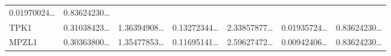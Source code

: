 \documentclass[
]{article}
\begin{document}
\begin{longtable}[]{@{}lllllll@{}}
\begin{minipage}[t]{0.12\columnwidth}
0.01970024\ldots{}\strut
\end{minipage} & \begin{minipage}[t]{0.12\columnwidth}\raggedright
0.83624230\ldots{}\strut
\end{minipage}\tabularnewline
\begin{minipage}[t]{0.08\columnwidth}\raggedright
TPK1\strut
\end{minipage} & \begin{minipage}[t]{0.12\columnwidth}\raggedright
0.31038423\ldots{}\strut
\end{minipage} & \begin{minipage}[t]{0.12\columnwidth}\raggedright
1.36394908\ldots{}\strut
\end{minipage} & \begin{minipage}[t]{0.12\columnwidth}\raggedright
0.13272344\ldots{}\strut
\end{minipage} & \begin{minipage}[t]{0.12\columnwidth}\raggedright
2.33857877\ldots{}\strut
\end{minipage} & \begin{minipage}[t]{0.12\columnwidth}\raggedright
0.01935724\ldots{}\strut
\end{minipage} & \begin{minipage}[t]{0.12\columnwidth}\raggedright
0.83624230\ldots{}\strut
\end{minipage}\tabularnewline
\begin{minipage}[t]{0.08\columnwidth}\raggedright
MPZL1\strut
\end{minipage} & \begin{minipage}[t]{0.12\columnwidth}\raggedright
0.30363800\ldots{}\strut
\end{minipage} & \begin{minipage}[t]{0.12\columnwidth}\raggedright
1.35477853\ldots{}\strut
\end{minipage} & \begin{minipage}[t]{0.12\columnwidth}\raggedright
0.11695141\ldots{}\strut
\end{minipage} & \begin{minipage}[t]{0.12\columnwidth}\raggedright
2.59627472\ldots{}\strut
\end{minipage} & \begin{minipage}[t]{0.12\columnwidth}\raggedright
0.00942406\ldots{}\strut
\end{minipage} & \begin{minipage}[t]{0.12\columnwidth}\raggedright
0.83624230\ldots{}\strut
\end{minipage}\tabularnewline
\bottomrule
\end{longtable}
\end{document}
